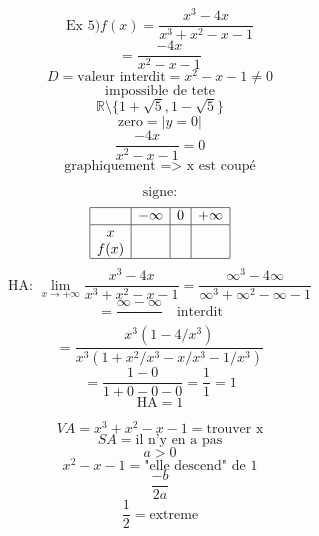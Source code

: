 \documentclass{article}
\begin{document}
\[
\text{Ex 5)} f(x) = \frac{x^3 - 4x}{x^3 + x^2 - x - 1}
\]
\[
= \frac{-4x}{x^2 - x - 1}
\]
\[
D = \text{valeur interdit} = x^2 - x - 1 \neq 0
\]
\[
\text{impossible de tete}
\]
\[
\mathbb{R} \setminus \{1 + \sqrt{5}, 1 - \sqrt{5}\}
\]
\[
\text{zero} = | y = 0 |
\]
\[
\frac{-4x}{x^2 - x - 1} = 0
\]
\[
\text{graphiquement => x est coupé}
\]

\[
\text{signe:}
\]
\[
\begin{array}{|c|c|c|c|}
\hline
 & -\infty & 0 & +\infty \\
\hline
x & & & \\
f(x) & & & \\
\hline
\end{array}
\]
\[
\text{HA: } \lim_{x \to +\infty} \frac{x^3 - 4x}{x^3 + x^2 - x - 1} = \frac{\infty^3 - 4\infty}{\infty^3 + \infty^2 - \infty - 1}
\]
\[
= \frac{\infty - \infty}{} \quad \text{interdit}
\]
\[
= \frac{x^3(1 - 4/x^3)}{x^3(1 + x^2/x^3 - x/x^3 - 1/x^3)}
\]
\[
= \frac{1 - 0}{1 + 0 - 0 - 0} = \frac{1}{1} = 1
\]
\[
\text{HA} = 1
\]

\[ VA = x^3 + x^2 - x - 1 = \text{trouver x} \]
\[ SA = \text{il n'y en a pas} \]
\[ a > 0 \]
\[ x^2 - x - 1 = \text{"elle descend" de 1} \]
\[ \frac{-b}{2a} \]
\[ \frac{1}{2} = \text{extreme} \]
\end{document}
